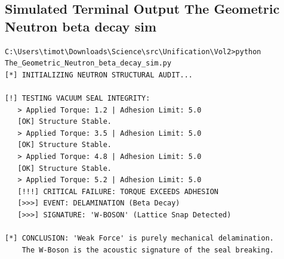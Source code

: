 \documentclass[11pt, letterpaper, openany]{book}
\begin{document}
\subsection*{Simulated Terminal Output The Geometric Neutron beta decay sim}
\begin{lstlisting}[style=terminal]
C:\Users\timot\Downloads\Science\src\Unification\Vol2>python The_Geometric_Neutron_beta_decay_sim.py
[*] INITIALIZING NEUTRON STRUCTURAL AUDIT...

[!] TESTING VACUUM SEAL INTEGRITY:
   > Applied Torque: 1.2 | Adhesion Limit: 5.0
   [OK] Structure Stable.
   > Applied Torque: 3.5 | Adhesion Limit: 5.0
   [OK] Structure Stable.
   > Applied Torque: 4.8 | Adhesion Limit: 5.0
   [OK] Structure Stable.
   > Applied Torque: 5.2 | Adhesion Limit: 5.0
   [!!!] CRITICAL FAILURE: TORQUE EXCEEDS ADHESION
   [>>>] EVENT: DELAMINATION (Beta Decay)
   [>>>] SIGNATURE: 'W-BOSON' (Lattice Snap Detected)

[*] CONCLUSION: 'Weak Force' is purely mechanical delamination.
    The W-Boson is the acoustic signature of the seal breaking.

\end{lstlisting}

\end{document}
